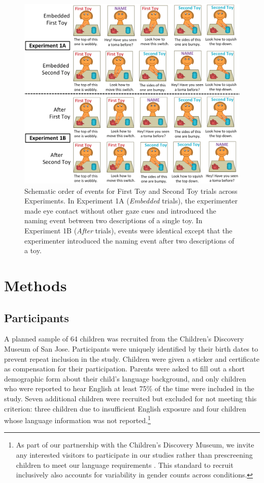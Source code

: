 \documentclass[man]{apa2}
\begin{document}
\begin{figure} 
  \begin{center} 
    \includegraphics[width=6in]{figures/continuity_demo_all_trials.png} 
    \caption{\label{fig:demo} Schematic order of events for First Toy and Second Toy trials across Experiments. In Experiment 1A (\emph{Embedded} trials), the experimenter made eye contact without other gaze cues and introduced the naming event between two descriptions of a single toy.  In Experiment 1B (\emph{After} trials), events were identical except that the experimenter introduced the naming event after two descriptions of a toy.} 
  \end{center} 
\end{figure}	

\section{Methods}


\subsection{Participants}

A planned sample of 64 children was recruited from the Children's Discovery Museum of San Jose.  Participants were uniquely identified by their birth dates to prevent repeat inclusion in the study.  Children were given a sticker and certificate as compensation for their participation.  Parents were asked to fill out a short demographic form about their child's language background, and only children who were reported to hear English at least 75\% of the time were included in the study.  Seven additional children were recruited but excluded for not meeting this criterion: three children due to insufficient English exposure and four children whose language information was not reported.\footnote{As part of our partnership with the Children's Discovery Museum, we invite any interested visitors to participate in our studies rather than prescreening children to meet our language requirements \cite{callanan2012}. This standard to recruit inclusively also accounts for variability in gender counts across conditions.}
\end{document}
